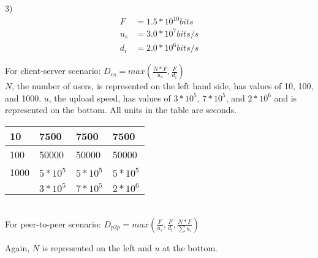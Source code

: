 \documentclass[12pt]{report}
\begin{document}
3)
\begin{align*}
F &= 1.5*10^{10} bits\\
u_s &= 3.0 * 10^7 bits/s\\
d_i &= 2.0 * 10^6 bits/s
\end{align*}

\centering

For client-server scenario: $D_{cs} = max\left(\frac{N*F}{u_s}, \frac{F}{d_i}\right)$\\
\medskip
$N$, the number of users, is represented on the left hand side, has values of 10, 100, and 1000. $u$, the upload speed, has values of $3*10^5$, $7*10^5$, and $2*10^6$ and is represented on the bottom. All units in the table are seconds.

\begin{table}[h]
	\centering
	\begin{tabular}{l|l|l|l|}
		\hline
		\multicolumn{1}{|l|}{10}  & 7500                    & 7500                    & 7500                    \\ \hline
		\multicolumn{1}{|l|}{100} & 50000                   & 50000                   & 50000                   \\ \hline
		\multicolumn{1}{|l|}{1000} & $5*10^5$ & $5*10^5$ & $5*10^5$ \\ \hline
		& $3*10^5$ & $7*10^5$ & $2*10^6$ \\ \cline{2-4} 
	\end{tabular}
\end{table}
\hrulefill\\
\medskip
For peer-to-peer scenario: $D_{p2p} = max\left(\frac{F}{u_s}, \frac{F}{d_i}, \frac{N*F}{\sum{u_i}}\right)$

Again, $N$ is represented on the left and $u$ at the bottom.
\end{document}
